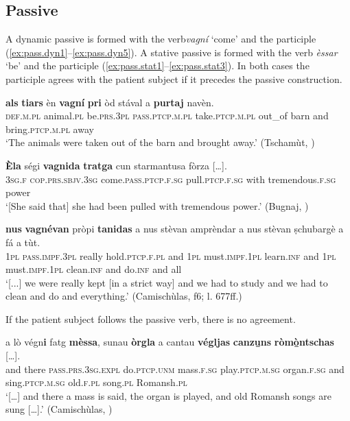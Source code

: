 \subsection{Passive}
A dynamic passive is formed with the verb\textit{vagní} ‘come’ and the participle (\ref{ex:pass.dyn1}--\ref{ex:pass.dyn5}). A stative passive is formed with the verb \textit{èssar} `be' and the participle (\ref{ex:pass.stat1}--\ref{ex:pass.stat3}). In both cases the participle agrees with the patient subject if it precedes the passive construction.

\ea
\label{ex:pass.dyn1}
\gll    [...] \textbf{als} \textbf{tiars} èn \textbf{vagní} \textbf{pri} òd stával a \textbf{purtaj} navèn.\\
{}    \textsc{def.m.pl}  animal.\textsc{pl}  be.\textsc{prs.3pl}   \textsc{pass.ptcp.m.pl}   take.\textsc{ptcp.m.pl}  out\_of barn and bring.\textsc{ptcp.m.pl}  away\\
\glt `The animals were taken out of the barn and brought away.' (Tschamùt, \citealt[53]{Büchli1966})
\z

\ea
\label{ex:pass.dyn2}
\gll \textbf{Èla} ségi \textbf{vagnida} \textbf{tratga} cun starmantusa fòrza […].\\
\textsc{3sg.f} \textsc{cop.prs.sbjv.3sg} come.\textsc{pass.ptcp.f.sg} pull.\textsc{ptcp.f.sg} with tremendous.\textsc{f.sg} power\\
\glt `[She said that] she had been pulled with tremendous power.' (Bugnaj, \citealt[132]{Büchli1966})
\z

\ea
\label{ex:pass.dyn3}
\gll    [...] \textbf{nus} \textbf{vagnévan} pròpi \textbf{tanidas} a nus stèvan amprèndar a nus stèvan ṣchubargè a fá a tùt.\\
{} \textsc{1pl} \textsc{pass.impf.3pl} really hold.\textsc{ptcp.f.pl} and \textsc{1pl} must.\textsc{impf.1pl} learn.\textsc{inf} and \textsc{1pl}  must.\textsc{impf.1pl} clean.\textsc{inf} and do.\textsc{inf} and all\\
\glt `[...] we were really kept [in a strict way] and we had to study and we had to clean and do and everything.' (Camischùlas, f6; l. 677ff.)
\z

If the patient subject follows the passive verb, there is no agreement.

\ea
\label{ex:pass.dyn4}
\gll    [...] a lò végn\textbf{i} fatg \textbf{mèssa}, sunau \textbf{òrgla} a cantau \textbf{végljas} \textbf{canzu̱ns} \textbf{ròmò̱ntschas} […].\\
{} and there \textsc{pass.prs.3sg}.\textsc{expl} do.\textsc{ptcp.unm} mass.\textsc{f.sg} play.\textsc{ptcp.m.sg} organ.\textsc{f.sg}  and sing.\textsc{ptcp.m.sg} old.\textsc{f.pl} song.\textsc{pl} Romansh.\textsc{pl}\\
\glt `[…] and there a mass is said, the organ is played, and old Romansh songs are sung […].' (Camischùlas, \citealt[94]{Büchli1966})
\z

